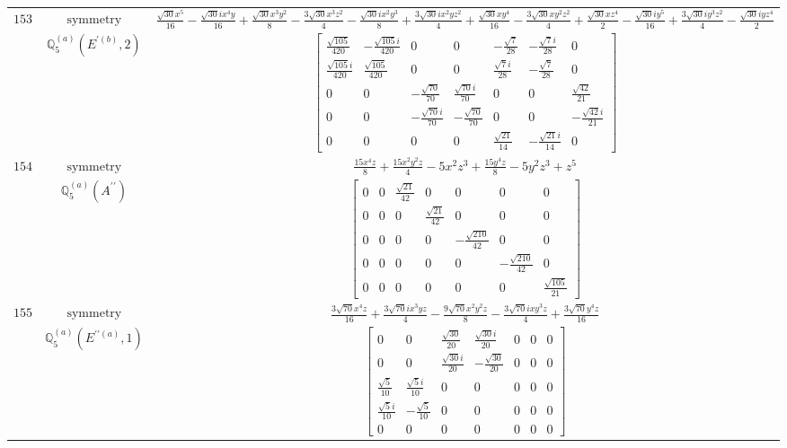 \documentclass[fleqn,8pt,landscape]{jsarticle}
\begin{document}
\begin{longtable}{ccc}
$ 153 $ & $ \text{symmetry} $ & $ \frac{\sqrt{30} x^{5}}{16} - \frac{\sqrt{30} i x^{4} y}{16} + \frac{\sqrt{30} x^{3} y^{2}}{8} - \frac{3 \sqrt{30} x^{3} z^{2}}{4} - \frac{\sqrt{30} i x^{2} y^{3}}{8} + \frac{3 \sqrt{30} i x^{2} y z^{2}}{4} + \frac{\sqrt{30} x y^{4}}{16} - \frac{3 \sqrt{30} x y^{2} z^{2}}{4} + \frac{\sqrt{30} x z^{4}}{2} - \frac{\sqrt{30} i y^{5}}{16} + \frac{3 \sqrt{30} i y^{3} z^{2}}{4} - \frac{\sqrt{30} i y z^{4}}{2} $ \\
$  $ & $ \mathbb{Q}_{5}^{(a)}(E^{\prime(b)},2) $ & $ \begin{bmatrix} \frac{\sqrt{105}}{420} & - \frac{\sqrt{105} i}{420} & 0 & 0 & - \frac{\sqrt{7}}{28} & - \frac{\sqrt{7} i}{28} & 0 \\ \frac{\sqrt{105} i}{420} & \frac{\sqrt{105}}{420} & 0 & 0 & \frac{\sqrt{7} i}{28} & - \frac{\sqrt{7}}{28} & 0 \\ 0 & 0 & - \frac{\sqrt{70}}{70} & \frac{\sqrt{70} i}{70} & 0 & 0 & \frac{\sqrt{42}}{21} \\ 0 & 0 & - \frac{\sqrt{70} i}{70} & - \frac{\sqrt{70}}{70} & 0 & 0 & - \frac{\sqrt{42} i}{21} \\ 0 & 0 & 0 & 0 & \frac{\sqrt{21}}{14} & - \frac{\sqrt{21} i}{14} & 0 \end{bmatrix} $ \\ \hline
$ 154 $ & $ \text{symmetry} $ & $ \frac{15 x^{4} z}{8} + \frac{15 x^{2} y^{2} z}{4} - 5 x^{2} z^{3} + \frac{15 y^{4} z}{8} - 5 y^{2} z^{3} + z^{5} $ \\
$  $ & $ \mathbb{Q}_{5}^{(a)}(A^{\prime\prime}) $ & $ \begin{bmatrix} 0 & 0 & \frac{\sqrt{21}}{42} & 0 & 0 & 0 & 0 \\ 0 & 0 & 0 & \frac{\sqrt{21}}{42} & 0 & 0 & 0 \\ 0 & 0 & 0 & 0 & - \frac{\sqrt{210}}{42} & 0 & 0 \\ 0 & 0 & 0 & 0 & 0 & - \frac{\sqrt{210}}{42} & 0 \\ 0 & 0 & 0 & 0 & 0 & 0 & \frac{\sqrt{105}}{21} \end{bmatrix} $ \\ \hline
$ 155 $ & $ \text{symmetry} $ & $ \frac{3 \sqrt{70} x^{4} z}{16} + \frac{3 \sqrt{70} i x^{3} y z}{4} - \frac{9 \sqrt{70} x^{2} y^{2} z}{8} - \frac{3 \sqrt{70} i x y^{3} z}{4} + \frac{3 \sqrt{70} y^{4} z}{16} $ \\
$  $ & $ \mathbb{Q}_{5}^{(a)}(E^{\prime\prime(a)},1) $ & $ \begin{bmatrix} 0 & 0 & \frac{\sqrt{30}}{20} & \frac{\sqrt{30} i}{20} & 0 & 0 & 0 \\ 0 & 0 & \frac{\sqrt{30} i}{20} & - \frac{\sqrt{30}}{20} & 0 & 0 & 0 \\ \frac{\sqrt{5}}{10} & \frac{\sqrt{5} i}{10} & 0 & 0 & 0 & 0 & 0 \\ \frac{\sqrt{5} i}{10} & - \frac{\sqrt{5}}{10} & 0 & 0 & 0 & 0 & 0 \\ 0 & 0 & 0 & 0 & 0 & 0 & 0 \end{bmatrix} $ \\ \hline

\end{longtable}
\end{document}
